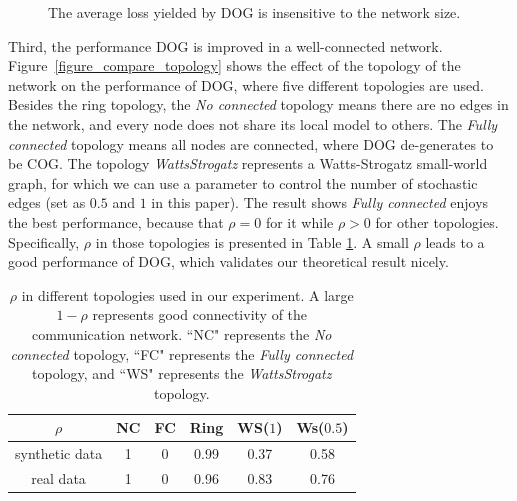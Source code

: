 \documentclass{article}
\begin{document}
\begin{figure}[!h]
\caption{The average loss yielded by DOG is insensitive to the network size.}
\label{figure_compare_network_size}
\end{figure}


Third, the performance DOG is improved in a well-connected network. Figure~\ref{figure_compare_topology} shows the effect of the topology of the network on the performance of DOG, where five different topologies are used. Besides the ring topology, the \textit{No connected} topology means there are no edges in the network, and every node does not share its local model to others. The \textit{Fully connected} topology means all nodes are connected, where DOG de-generates to be COG. The topology  \textit{WattsStrogatz} represents a Watts-Strogatz small-world graph, for which we can use a parameter to control the number of stochastic edges (set as $0.5$ and $1$ in this paper). The result shows \textit{Fully connected} enjoys the best performance, because that $\rho = 0$ for it while $\rho>0$ for other topologies. Specifically, $\rho$ in those topologies is presented in Table \ref{table_rho}. A small $\rho$ leads to a good performance of DOG, which validates our theoretical result nicely. 


\begin{table}[!]
\begin{tabular}{c|c|c|c|c|c}
\hline
$\rho$    & NC & FC & Ring & WS($1$) &  Ws($0.5$) \\ \hline  \hline
synthetic data & 1            & 0               &   0.99   &       0.37            &  0.58 \\ \hline
real data     & 1            & 0               &    0.96   &          0.83         &  0.76 \\ \hline
\end{tabular}
\caption{$\rho$ in different topologies used in our experiment. A large $1-\rho$ represents good connectivity of the communication network. ``NC" represents the \textit{No connected} topology, ``FC" represents the \textit{Fully connected} topology, and ``WS" represents the \textit{WattsStrogatz} topology.}
\label{table_rho}
\end{table}
\end{document}
